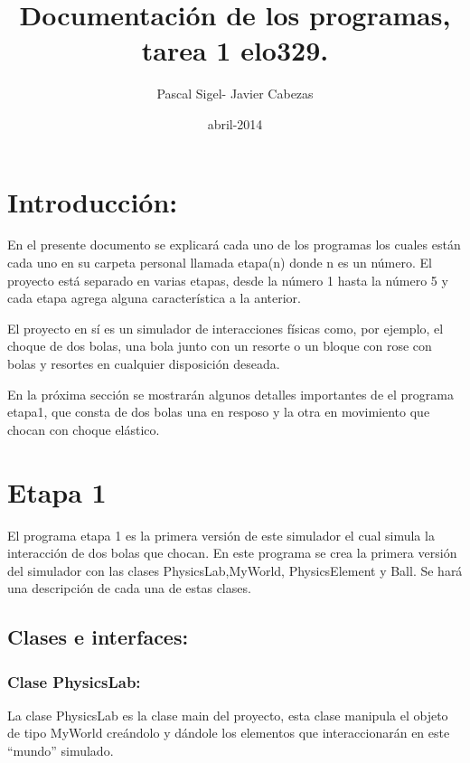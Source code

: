 \documentclass[a4paper,10pt]{article}
\title{Documentación de los programas, tarea 1 elo329.}
\author{Pascal Sigel- Javier Cabezas}
\date{abril-2014}
\begin{document}
\maketitle
\newpage
\section{Introducción:}


En el presente documento se explicará cada uno de los programas los cuales están cada uno en su carpeta personal llamada etapa(n) donde n 
es un número. El proyecto está separado en varias etapas, desde la número 1 hasta la número 5 y cada etapa agrega alguna característica a 
la anterior.\newline

El proyecto en sí es un simulador de interacciones físicas como, por ejemplo, el choque de dos bolas, una bola junto con un resorte 
o un bloque con rose con bolas y resortes en cualquier disposición deseada.\newline

En la próxima sección se mostrarán algunos detalles importantes de el programa etapa1, que consta de dos bolas una en resposo y la otra en 
movimiento que chocan con choque elástico.

\section{Etapa 1}

El programa etapa 1 es la primera versión de este simulador el cual simula la interacción de dos bolas que chocan. 
En este programa se crea la primera versión del simulador con las clases PhysicsLab,MyWorld, PhysicsElement y Ball. Se hará
una descripción de cada una de estas clases.\newline


\subsection{Clases e interfaces:}


\subsubsection{Clase PhysicsLab:}


La clase PhysicsLab es la clase main del proyecto, esta clase manipula el objeto de tipo MyWorld creándolo y dándole los elementos que
interaccionarán en este ``mundo'' simulado.\newline
\end{document}
